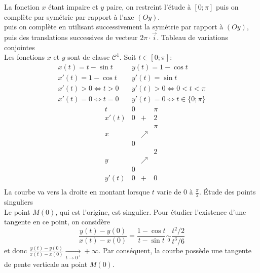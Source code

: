 {\begin{enumerate}
{\begin{itemize}
La fonction $x$ étant impaire et $y$ paire, on restreint l'étude à $[0;\pi]$ 
puis on complète par symétrie par rapport à l'axe $(Oy)$. \\
 puis on complète
en utilisant successivement la symétrie par rapport à $(Oy)$, puis des translations successives 
de vecteur $2\pi\cdot\vec{i}$.
Tableau de variations conjointes\\
Les fonctions $x$ et $y$ sont de classe $\mathcal{C}^1$. Soit $t\in[0;\pi]$:
$$\begin{array}{lcl}
x(t)=t-\sin t&\ &y(t)=1-\cos t\\
x'(t)=1-\cos t&\ &y'(t)=\sin t\\
x'(t)>0\Longleftrightarrow t>0&\ &y'(t)>0\Longleftrightarrow 0<t<\pi\\
x'(t)=0\Longleftrightarrow t=0 &\ &y'(t)=0\Longleftrightarrow t\in\{0;\pi\}
\end{array}$$
$$\begin{array}{c|lcr}
t&0&\ &\pi\\\hline
x'(t)&0&+&2 \\\hline
\ &  &\ &\pi \\
x&\ &\nearrow &\ \\
\ &0 &\ & \\\hline
\ & &\ & 2\\
y&\ &\nearrow &\ \\
\ &0 &\ & \\\hline
y'(t)&0& + &0\ \\
\end{array}$$
La courbe va vers la droite en montant lorsque $t$ varie de $0$ à $\frac\pi2$.
\'Etude des points singuliers\\
Le point $M(0)$, qui est l'origine, est singulier. Pour étudier l'existence d'une tangente en ce point, on considère
$$\frac{y(t)-y(0)}{x(t)-x(0)}=\frac{1-\cos t}{t-\sin t}\underset{0}{\sim}\frac{t^2/2}{t^3/6}$$
et donc $\frac{y(t)-y(0)}{x(t)-x(0)}\xrightarrow[t\to 0^+]{}+\infty$. Par conséquent, la courbe possède une tangente de pente verticale au point $M(0)$.
\end{itemize}

\begin{center}
\end{center}}
\end{enumerate}}
